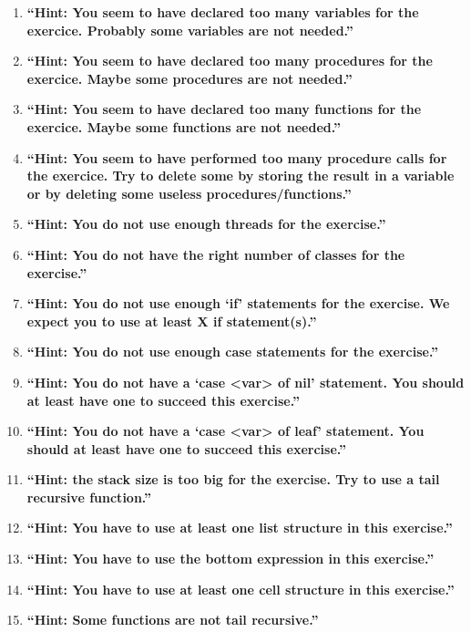 \documentclass[11pt,a4paper,twoside,openright]{report}
\begin{document}
\begin{enumerate}
\item \textbf{\enquote{Hint: You seem to have declared too many variables for 
the exercice. Probably some variables are not needed.}}
\item \textbf{\enquote{Hint:  You seem to have declared too many procedures for 
the exercice. Maybe some procedures are not needed.}}
\item \textbf{\enquote{Hint:  You seem to have declared too many functions for 
the exercice. Maybe some functions are not needed.}}
\item \textbf{\enquote{Hint:  You seem to have performed too many procedure
calls for the exercice. Try to delete some by storing the result in a variable 
or by deleting some useless procedures/functions.}}
\item \textbf{\enquote{Hint:  You do not use enough threads for the exercise.}}
\item \textbf{\enquote{Hint:  You do not have the right number of classes for the exercise.}}
\item \textbf{\enquote{Hint:  You do not use enough \enquote{if} statements for the 
exercise. We expect you to use at least X if statement(s).}}
\item \textbf{\enquote{Hint:  You do not use enough case statements for the 
exercise.}}
\item \textbf{\enquote{Hint:  You do not have a \enquote{case <var> of nil} 
statement. You should at least have one to succeed this exercise.}}
\item \textbf{\enquote{Hint:  You do not have a \enquote{case <var> of leaf} 
statement. You should at least have one to succeed this exercise.}}
\item \textbf{\enquote{Hint:  the stack size is too big for the exercise. Try 
to use a tail recursive function.}}
\item \textbf{\enquote{Hint:  You have to use at least one list structure in 
this exercise.}}
\item \textbf{\enquote{Hint:  You have to use the bottom expression in this exercise.}}
\item \textbf{\enquote{Hint:  You have to use at least one cell structure in 
this exercise.}}
\item \textbf{\enquote{Hint:  Some functions are not tail recursive.}}
\end{enumerate}
\end{document}

